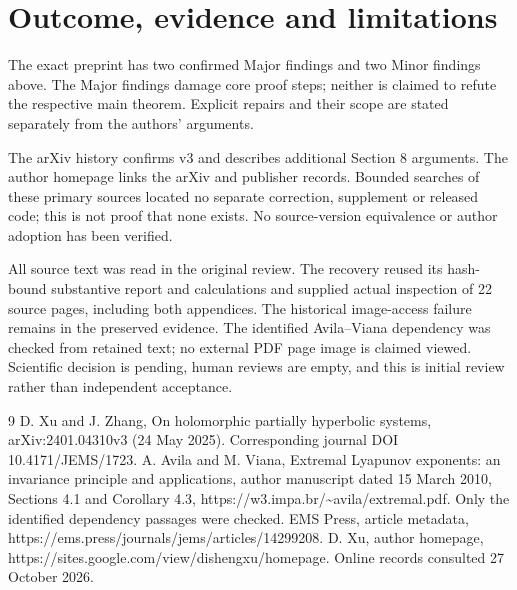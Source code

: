 \documentclass[10pt]{article}
\begin{document}
\section*{Outcome, evidence and limitations}
The exact preprint has two confirmed Major findings and two Minor findings above. The Major findings damage core proof steps; neither is claimed to refute the respective main theorem. Explicit repairs and their scope are stated separately from the authors’ arguments.\par
The arXiv history confirms v3 and describes additional Section 8 arguments. The author homepage links the arXiv and publisher records. Bounded searches of these primary sources located no separate correction, supplement or released code; this is not proof that none exists. No source-version equivalence or author adoption has been verified.\par
All source text was read in the original review. The recovery reused its hash-bound substantive report and calculations and supplied actual inspection of 22 source pages, including both appendices. The historical image-access failure remains in the preserved evidence. The identified Avila–Viana dependency was checked from retained text; no external PDF page image is claimed viewed. Scientific decision is pending, human reviews are empty, and this is initial review rather than independent acceptance.\par
9 D. Xu and J. Zhang, On holomorphic partially hyperbolic systems, arXiv:2401.04310v3 (24 May 2025). Corresponding journal DOI 10.4171/JEMS/1723. A. Avila and M. Viana, Extremal Lyapunov exponents: an invariance principle and applications, author manuscript dated 15 March 2010, Sections 4.1 and Corollary 4.3, https://w3.impa.br/\textasciitilde{}avila/extremal.pdf. Only the identified dependency passages were checked. EMS Press, article metadata, https://ems.press/journals/jems/articles/14299208. D. Xu, author homepage, https://sites.google.com/view/dishengxu/homepage. Online records consulted 27 October 2026.\par
\end{document}
